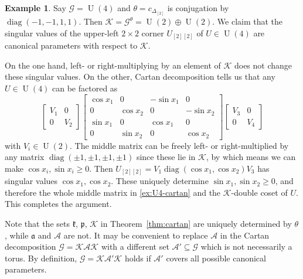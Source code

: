 \documentclass[reqno]{amsart}
\theoremstyle{definition} \newtheorem{example}[theorem]{Example}
\newcommand{\U}{\operatorname{U}}
\newcommand{\diag}{\operatorname{diag}}
\newcommand{\p}{\mathfrak{p}}
\newcommand{\G}{\mathcal{G}}
\newcommand{\K}{\mathcal{K}}
\renewcommand{\k}{\mathfrak{k}}
\newcommand{\A}{\mathcal{A}}
\renewcommand{\a}{\mathfrak{a}}
\begin{document}
\begin{example} \label{ex:U2xU2}
Say $\G = \U(4)$ and $\theta = c_{\Delta_{[2]}}$ is conjugation by $\diag(-1,-1,1,1)$. Then $\K = \G^\theta = \U(2) \oplus \U(2)$. We claim that the singular values of the upper-left $2 \times 2$ corner $U_{[2][2]}$ of $U \in \U(4)$ are canonical parameters with respect to $\K$.

On the one hand, left- or right-multiplying by an element of $\K$ does not change these singular values. On the other, Cartan decomposition tells us that any $U \in \U(4)$ can be factored as
\begin{equation} \label{ex:U4-cartan}
\begin{bmatrix} V_1 & 0 \\ 0 & V_2 \end{bmatrix}
\begin{bmatrix} \cos x_1 	& 	0	     & -\sin x_1 & 0 \\   
				0  			& \cos x_2	 & 0         & -\sin x_2\\
				\sin x_1  	& 0			 & \cos x_1  & 0\\
				0  			& \sin x_2	 & 0         & \cos x_2
\end{bmatrix}
\begin{bmatrix} V_3 & 0 \\ 0 & V_4 \end{bmatrix}
\end{equation}
with $V_i \in \U(2)$. The middle matrix can be freely left- or right-multiplied by any matrix $\diag(\pm 1, \pm 1, \pm 1, \pm 1)$ since these lie in $\K$, by which means we can make $\cos x_i, \sin x_i \geq 0$. Then $U_{[2][2]} = V_1 \diag(\cos x_1, \cos x_2) V_3$ has singular values $\cos x_1, \cos x_2$. These uniquely determine $\sin x_1, \sin x_2 \geq 0$, and therefore the whole middle matrix in \eqref{ex:U4-cartan} and the $\K$-double coset of $U$. This completes the argument.
\end{example}

Note that the sets $\k$, $\p$, $\K$ in Theorem~\ref{thm:cartan} are uniquely determined by $\theta$, while $\a$ and $\A$ are not. It may be convenient to replace $\A$ in the Cartan decomposition $\G = \K\A\K$ with a different set $\A' \subseteq \G$ which is not necessarily a torus. By definition, $\G = \K\A'\K$ holds if $\A'$ covers all possible canonical parameters.
\end{document}
